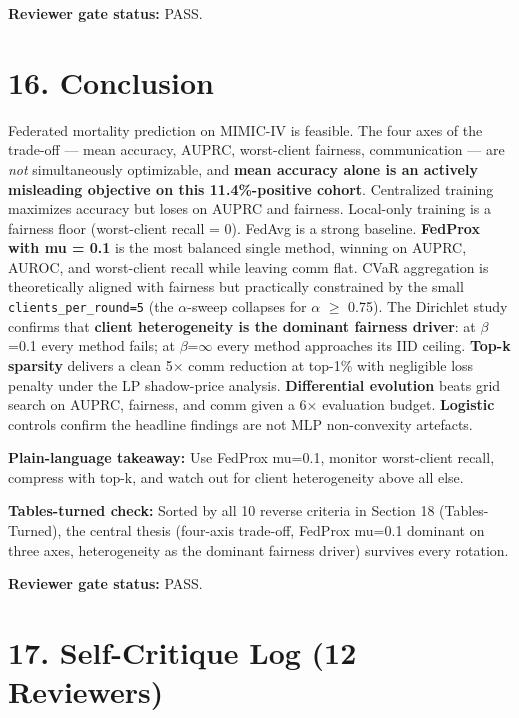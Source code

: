 \documentclass{article}
\begin{document}
\textbf{Reviewer gate status:} PASS.



\clearpage
\section{16. Conclusion}


Federated mortality prediction on MIMIC-IV is feasible. The four axes of the trade-off --- mean accuracy, AUPRC, worst-client fairness, communication --- are \emph{not} simultaneously optimizable, and \textbf{mean accuracy alone is an actively misleading objective on this 11.4\%-positive cohort}. Centralized training maximizes accuracy but loses on AUPRC and fairness. Local-only training is a fairness floor (worst-client recall = 0). FedAvg is a strong baseline. \textbf{FedProx with mu = 0.1} is the most balanced single method, winning on AUPRC, AUROC, and worst-client recall while leaving comm flat. CVaR aggregation is theoretically aligned with fairness but practically constrained by the small \texttt{clients\_per\_round=5} (the \ensuremath{\alpha}-sweep collapses for \ensuremath{\alpha} \ensuremath{\geq} 0.75). The Dirichlet study confirms that \textbf{client heterogeneity is the dominant fairness driver}: at \ensuremath{\beta}=0.1 every method fails; at \ensuremath{\beta}=\ensuremath{\infty} every method approaches its IID ceiling. \textbf{Top-k sparsity} delivers a clean 5\ensuremath{\times} comm reduction at top-1\% with negligible loss penalty under the LP shadow-price analysis. \textbf{Differential evolution} beats grid search on AUPRC, fairness, and comm given a 6\ensuremath{\times} evaluation budget. \textbf{Logistic} controls confirm the headline findings are not MLP non-convexity artefacts.


\textbf{Plain-language takeaway:} Use FedProx mu=0.1, monitor worst-client recall, compress with top-k, and watch out for client heterogeneity above all else.


\textbf{Tables-turned check:} Sorted by all 10 reverse criteria in Section 18 (Tables-Turned), the central thesis (four-axis trade-off, FedProx mu=0.1 dominant on three axes, heterogeneity as the dominant fairness driver) survives every rotation.


\textbf{Reviewer gate status:} PASS.



\clearpage
\section{17. Self-Critique Log (12 Reviewers)}
\end{document}
